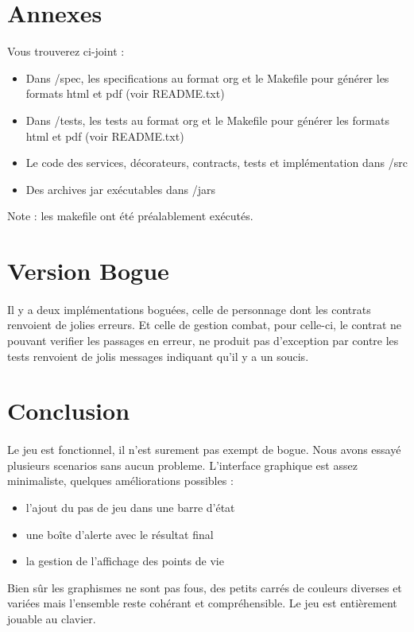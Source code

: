\documentclass[a4paper,titlepage,openany,12pt]{report}
\begin{document}
\section*{Annexes}

Vous trouverez ci-joint :
\begin{itemize}
\item Dans /spec, les specifications au format org et le Makefile pour générer les formats html et pdf (voir README.txt)
\item Dans /tests, les tests au format org et le Makefile pour générer les formats html et pdf (voir README.txt)
\item Le code des services, décorateurs, contracts, tests et implémentation dans /src
\item Des archives jar exécutables dans /jars
\end{itemize}
Note : les makefile ont été préalablement exécutés.

\section*{Version Bogue}
\paragraph{}
Il y a deux implémentations boguées, celle de personnage dont les
contrats renvoient de jolies erreurs.
Et celle de gestion combat, pour celle-ci, le contrat ne pouvant
verifier les passages en erreur, ne produit pas d'exception par contre
les tests renvoient de jolis messages indiquant qu'il y a un soucis.



\section*{Conclusion}

\paragraph{}
Le jeu est fonctionnel, il n'est surement pas exempt de bogue. Nous
avons essayé plusieurs scenarios sans aucun probleme. L'interface
graphique est assez minimaliste, quelques améliorations possibles :
\begin{itemize}
\item l'ajout du pas de jeu dans une barre d'état
\item une boîte d'alerte avec le résultat final
\item la gestion de l'affichage des points de vie
\end{itemize}
Bien sûr les graphismes ne sont pas fous, des petits carrés de couleurs
diverses et variées mais l'ensemble reste cohérant et compréhensible.
Le jeu est entièrement jouable au clavier.
\end{document}
